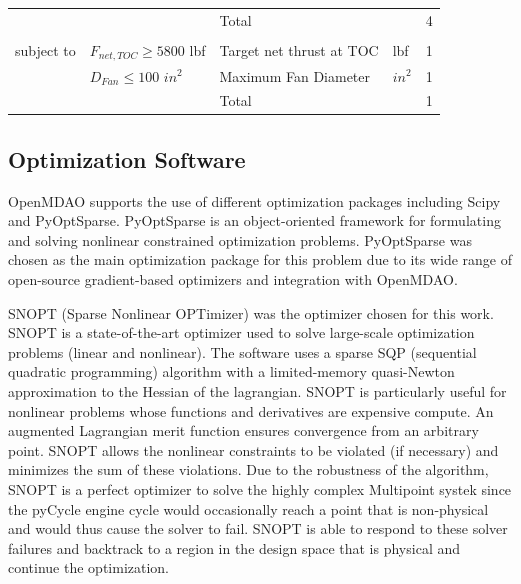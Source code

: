 \documentclass[conf]{new-aiaa}
\begin{document}
\begin{table}[h]
\begin{tabular}{r l l l l}
    \cline{3-5}
                    &                             & Total                                      &                 & 4        \\
                    &                             &                                            &                 &          \\
    subject to      & $F_{net,TOC} \geq 5800$ lbf & Target net thrust at TOC                   & lbf             & 1        \\
                    & $D_{Fan} \leq 100$ $in^2$   & Maximum Fan Diameter                       & $in^2$          & 1        \\
    \cline{3-5}
                    &                             & Total                                      &                 & 1        \\
    \bottomrule
  \end{tabular}
  \label{tab:opt_problem}
\end{table}

\subsection{Optimization Software}
OpenMDAO supports the use of different optimization packages including Scipy and PyOptSparse.
PyOptSparse is an object-oriented framework for formulating and solving nonlinear constrained optimization problems.
PyOptSparse was chosen as the main optimization package for this problem due to its wide range of open-source gradient-based optimizers and integration with OpenMDAO.

SNOPT (Sparse Nonlinear OPTimizer) was the optimizer chosen for this work.
SNOPT is a state-of-the-art optimizer used to solve large-scale optimization problems (linear and nonlinear).
The software uses a sparse SQP (sequential quadratic programming) algorithm with a limited-memory quasi-Newton approximation to the Hessian of the lagrangian.
SNOPT is particularly useful for nonlinear problems whose functions and derivatives are expensive compute.
An augmented Lagrangian merit function ensures convergence from an arbitrary point.
SNOPT allows the nonlinear constraints to be violated (if necessary) and minimizes the sum of these violations.
Due to the robustness of the algorithm, SNOPT is a perfect optimizer to solve the highly complex Multipoint systek since the pyCycle engine cycle would occasionally reach a point that is non-physical and would thus cause the solver to fail.
SNOPT is able to respond to these solver failures and backtrack to a region in the design space that is physical and continue the optimization.
\end{document}
